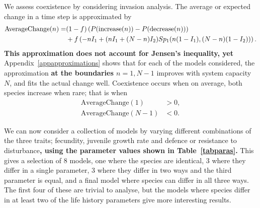 \documentclass[preprint,10pt,reqno]{report}
\begin{document}
We assess coexistence by considering invasion analysis. The average or expected change in a time step is approximated by
\begin{align}
\label{ac}
\text{AverageChange}(n)=&(1-f)\left(P(\text{increase}(n))-P(\text{decrease}(n))\right)  \\
&+f\left(-nI_1 +(nI_1+(N-n)I_2)Sp_1(n(1-I_1),(N-n)(1-I_2))\right).\notag
\end{align}
\textbf{This approximation does not account for Jensen's inequality, yet }Appendix~\ref{appapproximations} shows that for each of the models considered, the approximation \textbf{at the boundaries $n=1,N-1$} improves with system capacity $N$, and fits the actual change well. Coexistence occurs when on average, both species increase when rare; that is when
\begin{align}
\label{avch1}\text{AverageChange}(1)&>0,\\
\label{avchn-1}\text{AverageChange}(N-1)&<0. \end{align}

We can now consider a collection of models by varying different combinations of the three traits; fecundity, juvenile growth rate and defence or resistance to disturbance\textbf{, using the parameter values shown in Table~\ref{tabparas}.} This gives a selection of 8 models, one where the species are identical, 3 where they differ in a single parameter, 3 where they differ in two ways and the third parameter is equal, and a final model where species can differ in all three ways. The first four of these are trivial to analyse, but the models where species differ in at least two of the life history parameters give more interesting results.
\end{document}
